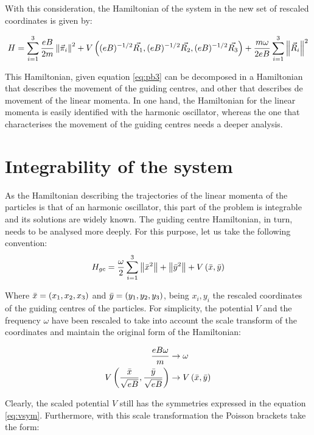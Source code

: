 With this consideration, the Hamiltonian of the system in the new set of rescaled coordinates is given by:

\begin{equation}
H = \sum_{i=1}^{3} \frac{eB}{2m} \left\lVert  \vec{\pi}_i \right\rVert^2
+ V\left(  (eB)^{-1/2}\vec{R_1},(eB)^{-1/2}\vec{R_2}, (eB)^{-1/2}\vec{R_3}  \right)
+\frac{m\omega}{2eB}\sum_{i=1}^{3} \left\lVert \vec{R}_i \right\rVert^2
\label{eq:newham}
\end{equation}

This Hamiltonian, given equation \eqref{eq:pb3} can be decomposed in a Hamiltonian that describes the movement of the guiding centres, and other that describes de movement of the linear momenta. In one hand, the Hamiltonian for the linear momenta is easily identified with the harmonic oscillator, whereas the one that characterises the movement of the guiding centres needs a deeper analysis.

\section{Integrability of the system}
As the Hamiltonian describing the trajectories of the linear momenta of the particles is that of an harmonic oscillator, this part of the problem is integrable and its solutions are widely known. The guiding centre Hamiltonian, in turn, needs to be analysed more deeply. For this purpose, let us take the following convention:\\


\begin{equation}
H_{gc} = \frac{\omega}{2} \sum_{i=1}^{3} \left\lVert \bar{x}^2 \right\rVert + \left\lVert \bar{y}^2 \right\rVert
+ V\left( \bar{x},\bar{y} \right)
\label{eq:hamgc}
\end{equation}

Where $\bar{x} = \left( x_1,x_2,x_3 \right)$ and $\bar{y} = \left( y_1,y_2,y_3 \right)$, being $x_i,y_i$ the rescaled coordinates of the guiding centres of the particles. For simplicity, the potential $V$ and the frequency $\omega$ have been rescaled to take into account the scale transform of the coordinates and maintain the original form of the Hamiltonian:

\begin{align*}
\frac{eB\omega}{m} &\rightarrow \omega\\
 V\left( \frac{\bar{x}}{\sqrt{eB}},\frac{\bar{y}}{\sqrt{eB}} \right) &\rightarrow V\left( \bar{x},\bar{y} \right)
\end{align*}

Clearly, the scaled potential $V$ still has the symmetries expressed in the equation \eqref{eq:vsym}. Furthermore, with this scale transformation the Poisson brackets take the form:

